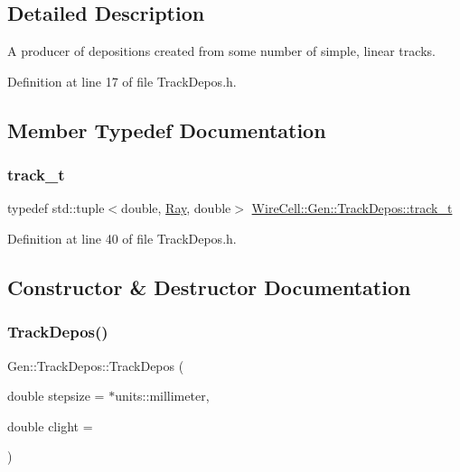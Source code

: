 \subsection{Detailed Description}
A producer of depositions created from some number of simple, linear tracks. 

Definition at line 17 of file Track\+Depos.\+h.



\subsection{Member Typedef Documentation}
\mbox{\label{class_wire_cell_1_1_gen_1_1_track_depos_a70b397dea6bfcd6d4181a1716b0f3e54}} 
\subsubsection{\texorpdfstring{track\+\_\+t}{track\_t}}
{\footnotesize\ttfamily typedef std\+::tuple$<$double, \hyperlink{namespace_wire_cell_a3ab20d9b438feb7eb1ffaab9ba98af0c}{Ray}, double$>$ \hyperlink{class_wire_cell_1_1_gen_1_1_track_depos_a70b397dea6bfcd6d4181a1716b0f3e54}{Wire\+Cell\+::\+Gen\+::\+Track\+Depos\+::track\+\_\+t}}



Definition at line 40 of file Track\+Depos.\+h.



\subsection{Constructor \& Destructor Documentation}
\mbox{\label{class_wire_cell_1_1_gen_1_1_track_depos_afe4fb6691d2d50e382987d53ed581eb7}} 
\subsubsection{\texorpdfstring{Track\+Depos()}{TrackDepos()}}
{\footnotesize\ttfamily Gen\+::\+Track\+Depos\+::\+Track\+Depos (\begin{DoxyParamCaption}\item[{double}]{stepsize = {$\ast$units\+:\+:millimeter},  }\item[{double}]{clight = {} }\end{DoxyParamCaption})}

